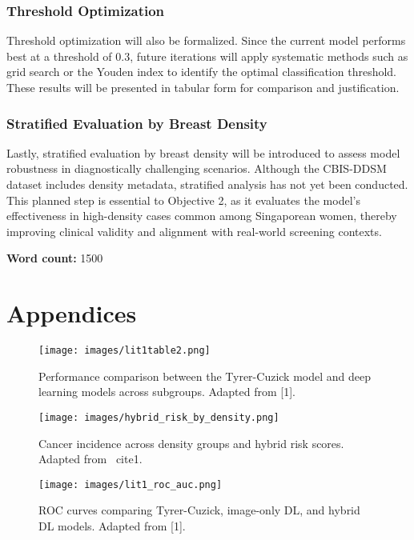 \documentclass[12pt]{article}
\begin{document}
\subsubsection{Threshold Optimization}
Threshold optimization will also be formalized. Since the current model performs best at a threshold of 0.3, future iterations will apply systematic methods such as grid search or the Youden index to identify the optimal classification threshold. These results will be presented in tabular form for comparison and justification.

\subsubsection{Stratified Evaluation by Breast Density}
Lastly, stratified evaluation by breast density will be introduced to assess model robustness in diagnostically challenging scenarios. Although the CBIS-DDSM dataset includes density metadata, stratified analysis has not yet been conducted. This planned step is essential to Objective 2, as it evaluates the model’s effectiveness in high-density cases common among Singaporean women, thereby improving clinical validity and alignment with real-world screening contexts.


\vspace{2em}
\noindent\textbf{Word count:} 1500


\newpage
\section{Appendices}

\begin{figure}[H]
    \centering
    \texttt{[image: images/lit1table2.png]}
    \caption{Performance comparison between the Tyrer-Cuzick model and deep learning models across subgroups. Adapted from [1].}
    \label{fig:lit1table2}
\end{figure}

\begin{figure}[H]
    \centering
    \texttt{[image: images/hybrid\_risk\_by\_density.png]}
    \caption{Cancer incidence across density groups and hybrid risk scores. Adapted from ~cite{1}.}
    \label{fig:hybrid_density}
\end{figure}

\begin{figure}[H]
    \centering
    \texttt{[image: images/lit1\_roc\_auc.png]}
    \caption{ROC curves comparing Tyrer-Cuzick, image-only DL, and hybrid DL models. Adapted from [1].}
    \label{fig:lit1roc}
\end{figure}
\end{document}
